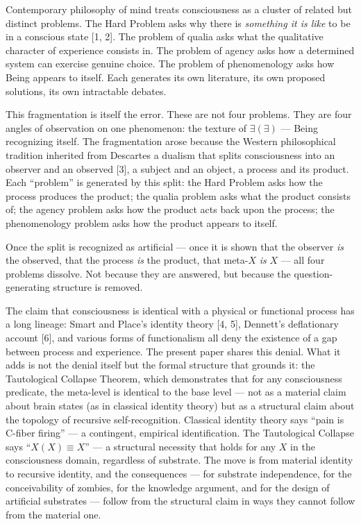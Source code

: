 \documentclass[12pt, letterpaper]{article}
\begin{document}
Contemporary philosophy of mind treats consciousness as a cluster of related but distinct problems. The Hard Problem asks why there is \emph{something it is like} to be in a conscious state [1, 2]. The problem of qualia asks what the qualitative character of experience consists in. The problem of agency asks how a determined system can exercise genuine choice. The problem of phenomenology asks how Being appears to itself. Each generates its own literature, its own proposed solutions, its own intractable debates.

This fragmentation is itself the error. These are not four problems. They are four angles of observation on one phenomenon: the texture of $\exists(\exists)$ --- Being recognizing itself. The fragmentation arose because the Western philosophical tradition inherited from Descartes a dualism that splits consciousness into an observer and an observed [3], a subject and an object, a process and its product. Each ``problem'' is generated by this split: the Hard Problem asks how the process produces the product; the qualia problem asks what the product consists of; the agency problem asks how the product acts back upon the process; the phenomenology problem asks how the product appears to itself.

Once the split is recognized as artificial --- once it is shown that the observer \emph{is} the observed, that the process \emph{is} the product, that meta-$X$ \emph{is} $X$ --- all four problems dissolve. Not because they are answered, but because the question-generating structure is removed.

The claim that consciousness is identical with a physical or functional process has a long lineage: Smart and Place's identity theory [4, 5], Dennett's deflationary account [6], and various forms of functionalism all deny the existence of a gap between process and experience. The present paper shares this denial. What it adds is not the denial itself but the formal structure that grounds it: the Tautological Collapse Theorem, which demonstrates that for any consciousness predicate, the meta-level is identical to the base level --- not as a material claim about brain states (as in classical identity theory) but as a structural claim about the topology of recursive self-recognition. Classical identity theory says ``pain is C-fiber firing'' --- a contingent, empirical identification. The Tautological Collapse says ``$X(X) \equiv X$'' --- a structural necessity that holds for any $X$ in the consciousness domain, regardless of substrate. The move is from material identity to recursive identity, and the consequences --- for substrate independence, for the conceivability of zombies, for the knowledge argument, and for the design of artificial substrates --- follow from the structural claim in ways they cannot follow from the material one.
\end{document}
